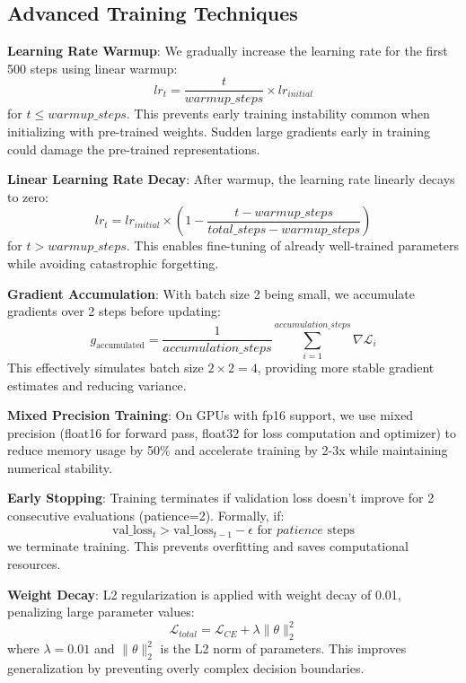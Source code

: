 \documentclass[12pt,a4paper,oneside]{report}
\begin{document}
\subsection{Advanced Training Techniques}

\textbf{Learning Rate Warmup}: We gradually increase the learning rate for the first 500 steps using linear warmup:
\begin{equation}
lr_t = \frac{t}{warmup\_steps} \times lr_{initial}
\end{equation}
for $t \leq warmup\_steps$. This prevents early training instability common when initializing with pre-trained weights. Sudden large gradients early in training could damage the pre-trained representations.

\textbf{Linear Learning Rate Decay}: After warmup, the learning rate linearly decays to zero:
\begin{equation}
lr_t = lr_{initial} \times \left(1 - \frac{t - warmup\_steps}{total\_steps - warmup\_steps}\right)
\end{equation}
for $t > warmup\_steps$. This enables fine-tuning of already well-trained parameters while avoiding catastrophic forgetting.

\textbf{Gradient Accumulation}: With batch size 2 being small, we accumulate gradients over 2 steps before updating:
\begin{equation}
g_{\text{accumulated}} = \frac{1}{accumulation\_steps} \sum_{i=1}^{accumulation\_steps} \nabla \mathcal{L}_i
\end{equation}
This effectively simulates batch size $2 \times 2 = 4$, providing more stable gradient estimates and reducing variance.

\textbf{Mixed Precision Training}: On GPUs with fp16 support, we use mixed precision (float16 for forward pass, float32 for loss computation and optimizer) to reduce memory usage by 50\% and accelerate training by 2-3x while maintaining numerical stability.

\textbf{Early Stopping}: Training terminates if validation loss doesn't improve for 2 consecutive evaluations (patience=2). Formally, if:
\begin{equation}
\text{val\_loss}_t > \text{val\_loss}_{t-1} - \epsilon \text{ for } patience \text{ steps}
\end{equation}
we terminate training. This prevents overfitting and saves computational resources.

\textbf{Weight Decay}: L2 regularization is applied with weight decay of 0.01, penalizing large parameter values:
\begin{equation}
\mathcal{L}_{total} = \mathcal{L}_{CE} + \lambda \|\theta\|_2^2
\end{equation}
where $\lambda = 0.01$ and $\|\theta\|_2^2$ is the L2 norm of parameters. This improves generalization by preventing overly complex decision boundaries.
\end{document}
